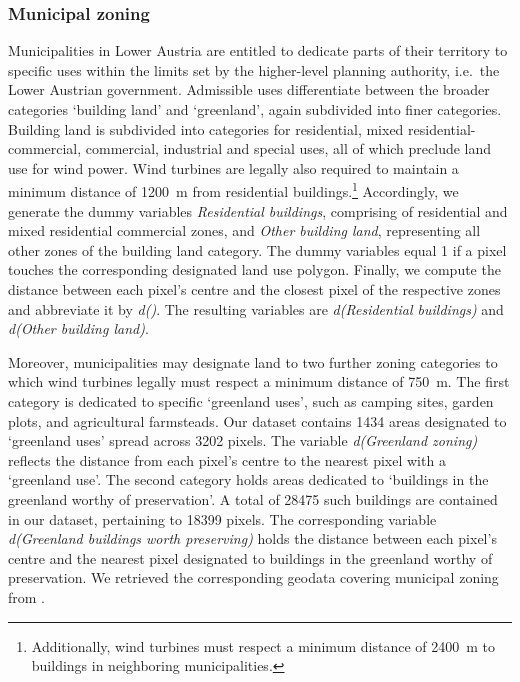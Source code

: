 \documentclass[review, a4paper, 12pt, authoryear, times]{elsarticle}
\begin{document}
\subsubsection{Municipal zoning}
Municipalities in Lower Austria are entitled to dedicate parts of their territory to specific uses within the limits set by the higher-level planning authority, i.e.\ the Lower Austrian government. 
Admissible uses differentiate between the broader categories `building land' and `greenland', again subdivided into finer categories.
Building land is subdivided into categories for residential, mixed residential-commercial, commercial, industrial and special uses, all of which preclude land use for wind power.
Wind turbines are legally also required to maintain a minimum distance of \SI{1200}{\metre} from residential buildings.\footnote{Additionally, wind turbines must respect a minimum distance of \SI{2400}{\metre} to buildings in neighboring municipalities.}
Accordingly, we generate the dummy variables \emph{Residential buildings}, comprising of residential and mixed residential commercial zones, and \emph{Other building land}, representing all other zones of the building land category.
The dummy variables equal \num{1} if a pixel touches the corresponding designated land use polygon. 
Finally, we compute the distance between each pixel's centre and the closest pixel of the respective zones and abbreviate it by \emph{d()}. 
The resulting variables are \emph{d(Residential buildings)} and \emph{d(Other building land)}.

Moreover, municipalities may designate land to two further zoning categories to which wind turbines legally must respect a minimum distance of \SI{750}{\metre}.
The first category is dedicated to specific `greenland uses', such as camping sites, garden plots, and agricultural farmsteads.
Our dataset contains \num{1434} areas designated to `greenland uses' spread across \num{3202} pixels.
The variable \emph{d(Greenland zoning)} reflects the distance from each pixel's centre to the nearest pixel with a `greenland use'.
The second category holds areas dedicated to `buildings in the greenland worthy of preservation'. 
A total of \num{28475} such buildings are contained in our dataset, pertaining to \num{18399} pixels.
The corresponding variable \emph{d(Greenland buildings worth preserving)} holds the distance between each pixel's centre and the nearest pixel designated to buildings in the greenland worthy of preservation.
We retrieved the corresponding geodata covering municipal zoning from \cite{LandNiederoesterreich2022a, LandNiederoesterreich2022}.
\end{document}
